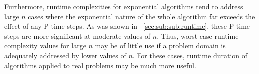 Furthermore, runtime complexities for exponential algorithms tend to address large \(n\) cases where the
exponential nature of the whole algorithm far exceeds the effect of any P-time steps.  As was shown in
\sectionname~\ref{sec:sub:sub:runtime}, these P-time steps are more significant at moderate values of \(n\).  Thus,
worst case runtime complexity values for large \(n\) may be of little use if a problem domain is adequately
addressed by lower values of \(n\).  For these cases, runtime duration of algorithms applied to real problems may
be much more useful.
